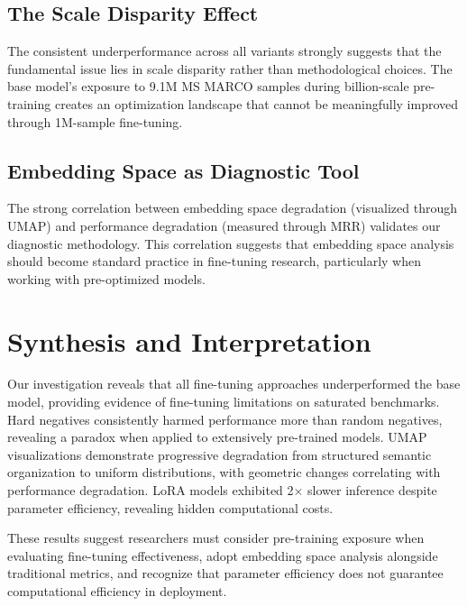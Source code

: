 \subsection{The Scale Disparity Effect}

The consistent underperformance across all variants strongly suggests that the fundamental issue lies in scale disparity rather than methodological choices. The base model's exposure to 9.1M MS MARCO samples during billion-scale pre-training creates an optimization landscape that cannot be meaningfully improved through 1M-sample fine-tuning.

\subsection{Embedding Space as Diagnostic Tool}

The strong correlation between embedding space degradation (visualized through UMAP) and performance degradation (measured through MRR) validates our diagnostic methodology. This correlation suggests that embedding space analysis should become standard practice in fine-tuning research, particularly when working with pre-optimized models.

\section{Synthesis and Interpretation}

Our investigation reveals that all fine-tuning approaches underperformed the base model, providing evidence of fine-tuning limitations on saturated benchmarks. Hard negatives consistently harmed performance more than random negatives, revealing a paradox when applied to extensively pre-trained models. UMAP visualizations demonstrate progressive degradation from structured semantic organization to uniform distributions, with geometric changes correlating with performance degradation. LoRA models exhibited 2× slower inference despite parameter efficiency, revealing hidden computational costs.

These results suggest researchers must consider pre-training exposure when evaluating fine-tuning effectiveness, adopt embedding space analysis alongside traditional metrics, and recognize that parameter efficiency does not guarantee computational efficiency in deployment.
